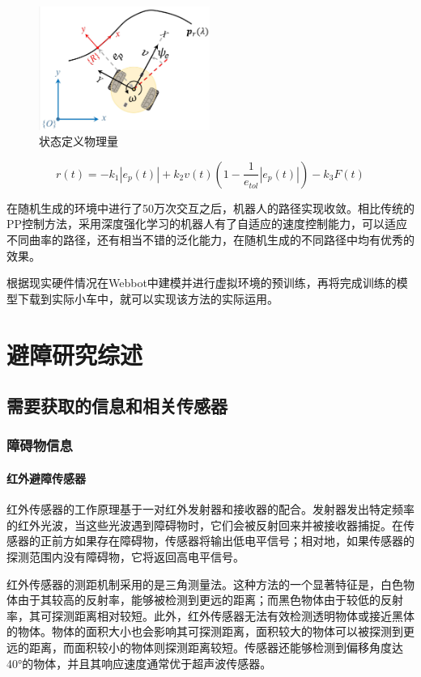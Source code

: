 \documentclass{report}
\begin{document}
\begin{figure}[ht]
  \centering
  \includegraphics[width=0.5\textwidth]{figures/state.png}
  \caption{状态定义物理量\cite{cao2024path}}
\end{figure}

\[ r\left(t\right)=-k_{1}\left|e_{p}\left(t\right)\right|+k_{2}v\left(t\right)\left(1-\frac{1}{e_{tol}}\left|e_{p}\left(t\right)\right|\right)-k_{3}F\left(t\right) \]

在随机生成的环境中进行了50万次交互之后，机器人的路径实现收敛。相比传统的PP控制方法，采用深度强化学习的机器人有了自适应的速度控制能力，可以适应不同曲率的路径，还有相当不错的泛化能力，在随机生成的不同路径中均有优秀的效果。

根据现实硬件情况在Webbot中建模并进行虚拟环境的预训练，再将完成训练的模型下载到实际小车中，就可以实现该方法的实际运用。
\section{避障研究综述}
\label{sec:label}
\subsection{需要获取的信息和相关传感器}
\label{subsec:label}
\subsubsection{障碍物信息}
\label{subsec:label}
\paragraph{红外避障传感器}

红外传感器的工作原理基于一对红外发射器和接收器的配合。发射器发出特定频率的红外光波，当这些光波遇到障碍物时，它们会被反射回来并被接收器捕捉。在传感器的正前方如果存在障碍物，传感器将输出低电平信号；相对地，如果传感器的探测范围内没有障碍物，它将返回高电平信号。

红外传感器的测距机制采用的是三角测量法。这种方法的一个显著特征是，白色物体由于其较高的反射率，能够被检测到更远的距离；而黑色物体由于较低的反射率，其可探测距离相对较短。此外，红外传感器无法有效检测透明物体或接近黑体的物体。物体的面积大小也会影响其可探测距离，面积较大的物体可以被探测到更远的距离，而面积较小的物体则探测距离较短。传感器还能够检测到偏移角度达40°的物体，并且其响应速度通常优于超声波传感器。
\end{document}
